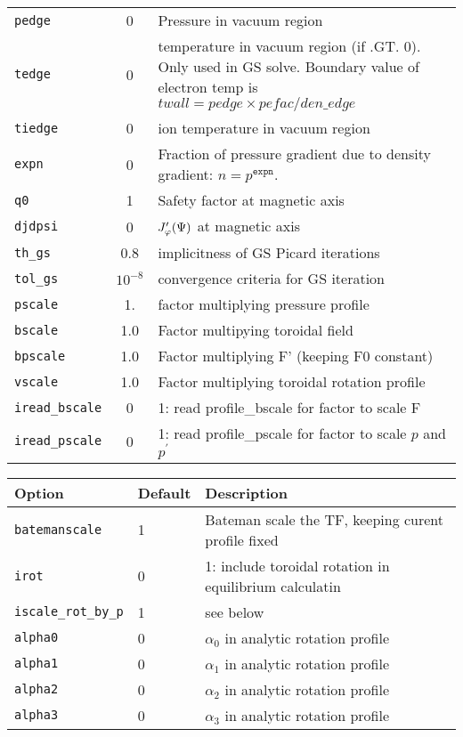 \begin{tabular}{lcp{4in}}
  \texttt{pedge} & 0	  & Pressure in vacuum region\\
  \texttt{tedge} & 0     & temperature in vacuum region (if .GT. 0).  Only
                           used in GS solve.   Boundary value of electron temp
                           is $twall = pedge \times pefac/den\_edge $ \\
 \texttt{tiedge} & 0     & ion temperature in vacuum region  \\
 \texttt{expn}  & 0 & \parbox[t]{4in}{Fraction of pressure gradient due to
    density gradient: $n = p^\mathtt{expn}$.}\\
 \texttt{q0}    & 1	  & Safety factor at magnetic axis\\
 \texttt{djdpsi}& 0	  & $J_\varphi'(\Psi)$ at magnetic axis\\
 \texttt{th\_gs}& 0.8     & implicitness of GS Picard iterations\\
 \texttt{tol\_gs}& $10^{-8}$  & convergence criteria for GS iteration \\
  \texttt{pscale}  & 1.       & factor multiplying pressure profile \\
  \texttt{bscale}      &  1.0 & Factor multipying toroidal field\\
  \texttt{bpscale}     &  1.0 & Factor multiplying F' (keeping F0 constant) \\
  \texttt{vscale}      &  1.0 & Factor multiplying toroidal rotation profile \\
  \texttt{iread\_bscale}&  0   & 1: read profile\_bscale for factor to scale F \\
  \texttt{iread\_pscale} & 0   & 1: read profile\_pscale for factor to scale $p$ and $p^{\prime} $ \\

\end{tabular}

\begin{tabular}{llp{4in}}
  \textbf{Option}&\textbf{Default}&\textbf{Description}\\
  \hline
  \texttt{batemanscale} &  1   & Bateman scale the TF, keeping curent profile fixed \\
  \texttt{irot}         &  0   & 1: include toroidal rotation in equilibrium calculatin \\
  \texttt{iscale\_rot\_by\_p} & 1 & see below \\
  \texttt{alpha0}       &  0   & $\alpha_0$ in analytic rotation profile \\
  \texttt{alpha1}      	&  0   & $\alpha_1$ in analytic	rotation profile \\
  \texttt{alpha2}      	&  0   & $\alpha_2$ in analytic	rotation profile \\
  \texttt{alpha3}      	&  0   & $\alpha_3$ in analytic	rotation profile \\
\end{tabular}

